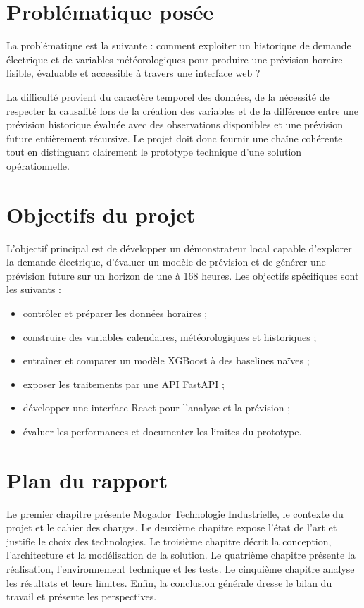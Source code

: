 \documentclass[12pt,a4paper]{report}
\begin{document}
\section{Problématique posée}

La problématique est la suivante : comment exploiter un historique de demande
électrique et de variables météorologiques pour produire une prévision horaire
lisible, évaluable et accessible à travers une interface web ?

La difficulté provient du caractère temporel des données, de la nécessité de
respecter la causalité lors de la création des variables et de la différence
entre une prévision historique évaluée avec des observations disponibles et
une prévision future entièrement récursive. Le projet doit donc fournir une
chaîne cohérente tout en distinguant clairement le prototype technique d'une
solution opérationnelle.

\section{Objectifs du projet}

L'objectif principal est de développer un démonstrateur local capable
d'explorer la demande électrique, d'évaluer un modèle de prévision et de
générer une prévision future sur un horizon de une à 168 heures. Les objectifs
spécifiques sont les suivants :

\begin{itemize}
	\item contrôler et préparer les données horaires ;
	\item construire des variables calendaires, météorologiques et historiques ;
	\item entraîner et comparer un modèle XGBoost à des baselines naïves ;
	\item exposer les traitements par une API FastAPI ;
	\item développer une interface React pour l'analyse et la prévision ;
	\item évaluer les performances et documenter les limites du prototype.
\end{itemize}

\section{Plan du rapport}

Le premier chapitre présente Mogador Technologie Industrielle, le contexte
du projet et le cahier des charges. Le deuxième chapitre expose l'état de
l'art et justifie le choix des technologies. Le troisième chapitre décrit la
conception, l'architecture et la modélisation de la solution. Le quatrième
chapitre présente la réalisation, l'environnement technique et les tests. Le
cinquième chapitre analyse les résultats et leurs limites. Enfin, la
conclusion générale dresse le bilan du travail et présente les perspectives.
\end{document}
